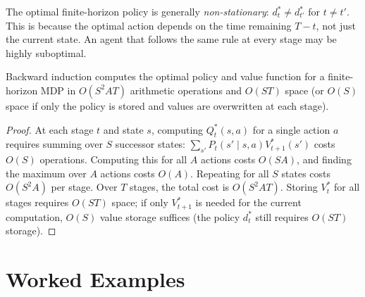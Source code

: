 \documentclass[11pt,a4paper]{article}
\begin{document}
\begin{remark}
\label{rem:non-stationary}
The optimal finite-horizon policy is generally \emph{non-stationary}:
$d_t^* \neq d_{t'}^*$ for $t \neq t'$. This is because the optimal
action depends on the time remaining $T - t$, not just the current
state. An agent that follows the same rule at every stage may be
highly suboptimal.
\end{remark}

\begin{proposition}
\label{prop:complexity}
Backward induction computes the optimal policy and value function for
a finite-horizon MDP in $O(S^2 A T)$ arithmetic operations and
$O(S T)$ space (or $O(S)$ space if only the policy is stored and
values are overwritten at each stage).
\end{proposition}

\begin{proof}
At each stage $t$ and state $s$, computing $Q_t^*(s,a)$ for a single
action $a$ requires summing over $S$ successor states:
$\sum_{s'} P_t(s' \mid s,a) V_{t+1}^*(s')$ costs $O(S)$ operations.
Computing this for all $A$ actions costs $O(SA)$, and finding the
maximum over $A$ actions costs $O(A)$. Repeating for all $S$ states
costs $O(S^2 A)$ per stage. Over $T$ stages, the total cost is
$O(S^2 A T)$. Storing $V_t^*$ for all stages requires $O(ST)$
space; if only $V_{t+1}^*$ is needed for the current computation,
$O(S)$ value storage suffices (the policy $d_t^*$ still requires
$O(ST)$ storage).
\end{proof}


\section{Worked Examples}
\label{sec:examples}
\end{document}

